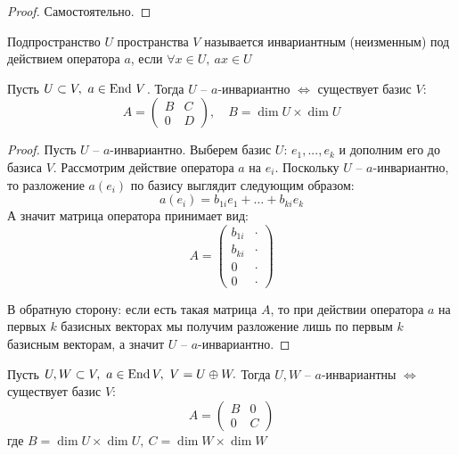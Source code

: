 \begin{proof}
	Самостоятельно. 
\end{proof}


\begin{Def}
	Подпространство $U$ пространства $V$ называется инвариантным (неизменным) под действием оператора $a$, если 
	$\forall x \in U, \ ax \in U$
\end{Def}

\begin{Lm}
	Пусть $U \subset V, \ a \in \operatorname{End} \, V$.
	Тогда $U$ -- $a$-инвариантно $\Leftrightarrow$ существует базис $V$: 
	$$A = 
	\left(\begin{array}{cc}
		B & C\\
		0 & D
		\end{array}\right), \quad B = \dim U \times \dim U$$
\end{Lm}

\begin{proof}
	Пусть $U$ -- $a$-инвариантно. Выберем базис $U$: $e_1, ... , e_k$ и дополним его до базиса $V$. 
	Рассмотрим действие оператора $a$ на $e_i$. Поскольку $U$ -- $a$-инвариантно, то разложение $a(e_i)$ по базису выглядит следующим образом:
	\[a(e_i) = b_{1i}e_1+\dots+b_{ki}e_k\]
	А значит матрица оператора принимает вид:
	\[A = \left(\begin{array}{cc}
		b_{1i} & \cdot\\
		b_{ki} & \cdot\\
		0 & \cdot \\
		0 & \cdot
	\end{array}
	\right)\]

	В обратную сторону: если есть такая матрица $A$, то при действии оператора $a$ на первых $k$ базисных векторах мы получим разложение лишь по первым $k$ базисным векторам, а значит $U$ -- $a$-инвариантно.

\end{proof}

\begin{Lm}
	Пусть $U, W \subset V, \ a \in \operatorname{End} V, \ V = U \oplus W.$ Тогда $U, W$ -- $a$-инвариантны $\Leftrightarrow$ существует базис $V$:
	\[A = \left(\begin{array}{cc}
		B & 0\\
		0 & C
	\end{array}\right)\]
	где $B = \dim U \times \dim U, \ C = \dim W \times \dim W$
\end{Lm}

